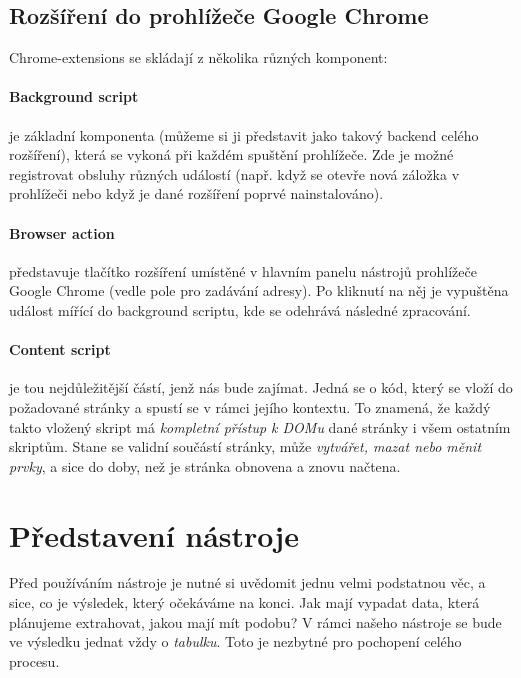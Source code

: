 \documentclass[thesis=B,czech]{FITthesis2}[2012/06/26]
\begin{document}
	\subsection{Rozšíření do prohlížeče Google Chrome}
	Chrome-extensions se skládají z několika různých komponent:
	\paragraph{Background script} je základní komponenta (můžeme si ji představit jako takový backend celého rozšíření), která se vykoná při každém spuštění prohlížeče. Zde je možné registrovat obsluhy různých událostí (např. když se otevře nová záložka v prohlížeči nebo když je dané rozšíření poprvé nainstalováno). 
	\paragraph{Browser action} představuje tlačítko rozšíření umístěné v hlavním panelu nástrojů prohlížeče Google Chrome (vedle pole pro zadávání adresy). Po kliknutí na něj je vypuštěna událost mířící do background scriptu, kde se odehrává následné zpracování.
	\paragraph{Content script}\label{def:content_script} je tou nejdůležitější částí, jenž nás bude zajímat. Jedná se o kód, který se vloží do požadované stránky a spustí se v rámci jejího kontextu. To znamená, že každý takto vložený skript má \emph{kompletní přístup k DOMu} dané stránky i všem ostatním skriptům. Stane se validní součástí stránky, může \emph{vytvářet, mazat nebo měnit prvky}, a sice do doby, než je stránka obnovena a znovu načtena.
	
	\section{Představení nástroje}
	Před používáním nástroje je nutné si uvědomit jednu velmi podstatnou věc, a sice, co je výsledek, který očekáváme na konci. Jak mají vypadat data, která plánujeme extrahovat, jakou mají mít podobu? V rámci našeho nástroje se bude ve výsledku jednat vždy o \emph{tabulku}. Toto je nezbytné pro pochopení celého procesu.
	
\end{document}
